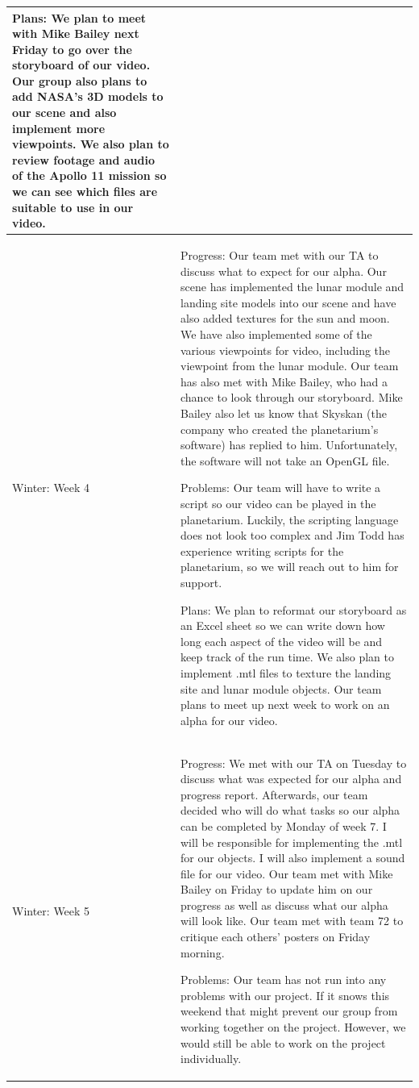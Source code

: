 \documentclass[onecolumn, draftclsnofoot,10pt, compsoc]{IEEEtran}
\begin{document}
\begin{longtable} {|p{1.5cm}|p{13.5cm}|}
Plans: We plan to meet with Mike Bailey next Friday to go over the storyboard of our video. Our group also plans to add NASA's 3D models to our scene and also implement more viewpoints. We also plan to review footage and audio of the Apollo 11 mission so we can see which files are suitable to use in our video.  
 \\ \hline

Winter: Week 4 &
Progress: Our team met with our TA to discuss what to expect for our alpha. Our scene has implemented the lunar module and landing site models into our scene and have also added textures for the sun and moon. We have also implemented some of the various viewpoints for video, including the viewpoint from the lunar module. Our team has also met with Mike Bailey, who had a chance to look through our storyboard. Mike Bailey also let us know that Skyskan (the company who created the planetarium's software) has replied to him. Unfortunately, the software will not take an OpenGL file. 

Problems: Our team will have to write a script so our video can be played in the planetarium. Luckily, the scripting language does not look too complex and Jim Todd has experience writing scripts for the planetarium, so we will reach out to him for support.

Plans: We plan to reformat our storyboard as an Excel sheet so we can write down how long each aspect of the video will be and keep track of the run time. We also plan to implement .mtl files to texture the landing site and lunar module objects. Our team plans to meet up next week to work on an alpha for our video.
\\ \hline

Winter: Week 5 & 
Progress: We met with our TA on Tuesday to discuss what was expected for our alpha and progress report. Afterwards, our team decided who will do what tasks so our alpha can be completed by Monday of week 7. I will be responsible for implementing the .mtl for our objects. I will also implement a sound file for our video. Our team met with Mike Bailey on Friday to update him on our progress as well as discuss what our alpha will look like. Our team met with team 72 to critique each others' posters on Friday morning.

Problems: Our team has not run into any problems with our project. If it snows this weekend that might prevent our group from working together on the project. However, we would still be able to work on the project individually.


\end{longtable}
\end{document}
